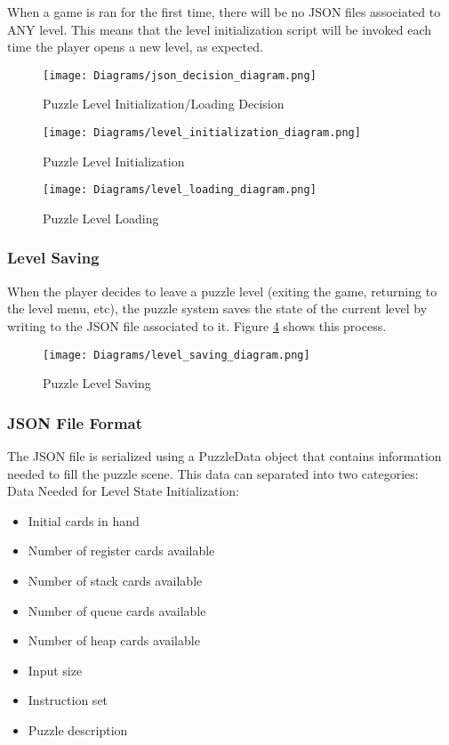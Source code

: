 When a game is ran for the first time, there will be no JSON files associated to
ANY level. This means that the level initialization script will be invoked each time
the player opens a new level, as expected.\\

\begin{figure}[!hb]
  \caption{Puzzle Level Initialization/Loading Decision}
  \label{fig:json_decision_diagram}
  \centering
  \texttt{[image: Diagrams/json\_decision\_diagram.png]}
\end{figure}
\vfill
\clearpage

\begin{figure}[!hb]
  \caption{Puzzle Level Initialization}
  \label{fig:level_initialization_diagram}
  \centering
  \texttt{[image: Diagrams/level\_initialization\_diagram.png]}
\end{figure}

\begin{figure}[!hb]
  \caption{Puzzle Level Loading}
  \label{fig:level_loading_diagram}
  \centering
  \texttt{[image: Diagrams/level\_loading\_diagram.png]}
\end{figure}
\vfill
\clearpage

\subsubsection{Level Saving}
When the player decides to leave a puzzle level (exiting the game, returning to the
level menu, etc), the puzzle system saves the state of the current level by writing
to the JSON file associated to it. Figure \ref{fig:level_saving_diagram} shows this process.

\begin{figure}[!hb]
  \caption{Puzzle Level Saving}
  \label{fig:level_saving_diagram}
  \centering
  \texttt{[image: Diagrams/level\_saving\_diagram.png]}
\end{figure}

\subsubsection{JSON File Format}
The JSON file is serialized using a PuzzleData object that contains information
needed to fill the puzzle scene. This data can separated into two categories:\\

Data Needed for Level State Initialization:
\begin{itemize}
  \item Initial cards in hand
  \item Number of register cards available
  \item Number of stack cards available
  \item Number of queue cards available
  \item Number of heap cards available
  \item Input size
  \item Instruction set
  \item Puzzle description
\end{itemize}

